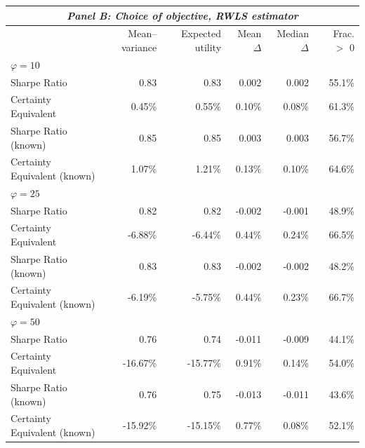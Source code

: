 \begin{tabular*}{\textwidth}{l@{\extracolsep{\fill}}rrrrr}
\multicolumn{6}{c}{\textit{Panel B: Choice of objective, RWLS estimator}} \\
\midrule
 & Mean--variance & Expected utility & Mean $\Delta$ & Median $\Delta$ & Frac. $>$ 0 \\
\midrule
\multicolumn{6}{l}{\textit{$\varphi = 10$}} \\
\midrule
Sharpe Ratio & 0.83 & 0.83 & 0.002 & 0.002 & 55.1\% \\
Certainty Equivalent & 0.45\% & 0.55\% & 0.10\% & 0.08\% & 61.3\% \\
Sharpe Ratio (known) & 0.85 & 0.85 & 0.003 & 0.003 & 56.7\% \\
Certainty Equivalent (known) & 1.07\% & 1.21\% & 0.13\% & 0.10\% & 64.6\% \\
\midrule
\multicolumn{6}{l}{\textit{$\varphi = 25$}} \\
\midrule
Sharpe Ratio & 0.82 & 0.82 & -0.002 & -0.001 & 48.9\% \\
Certainty Equivalent & -6.88\% & -6.44\% & 0.44\% & 0.24\% & 66.5\% \\
Sharpe Ratio (known) & 0.83 & 0.83 & -0.002 & -0.002 & 48.2\% \\
Certainty Equivalent (known) & -6.19\% & -5.75\% & 0.44\% & 0.23\% & 66.7\% \\
\midrule
\multicolumn{6}{l}{\textit{$\varphi = 50$}} \\
\midrule
Sharpe Ratio & 0.76 & 0.74 & -0.011 & -0.009 & 44.1\% \\
Certainty Equivalent & -16.67\% & -15.77\% & 0.91\% & 0.14\% & 54.0\% \\
Sharpe Ratio (known) & 0.76 & 0.75 & -0.013 & -0.011 & 43.6\% \\
Certainty Equivalent (known) & -15.92\% & -15.15\% & 0.77\% & 0.08\% & 52.1\% \\
\bottomrule
\end{tabular*}

